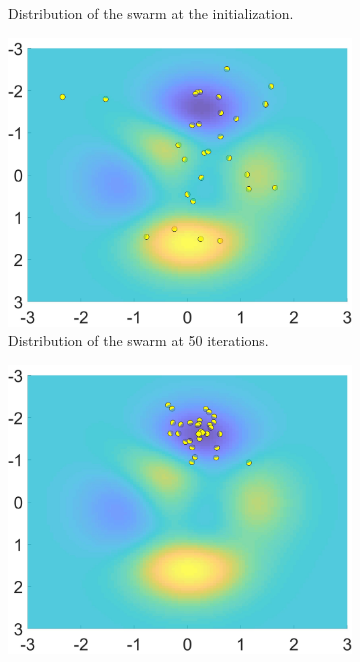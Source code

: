 \begin{figure}[hbp]
\begin{subfigure}[b]{0.5\textwidth}
    \caption{Distribution of the swarm at the initialization.}
    \label{fig:f2}
  \end{subfigure}
  \begin{subfigure}[b]{0.5\textwidth}
    \includegraphics[width=\textwidth, height=\textwidth]{Part 2 - Search-Based Optimization/Particle Swarm Optimization/Images/FIG3.1.jpg}
    \caption{Distribution of the swarm at 50 iterations.}
    \label{fig:f3}
  \end{subfigure}
  \begin{subfigure}[b]{0.5\textwidth}
    \includegraphics[width=\textwidth, height=\textwidth]{Part 2 - Search-Based Optimization/Particle Swarm Optimization/Images/FIG4.1.jpg}

\end{subfigure}
\end{figure}
